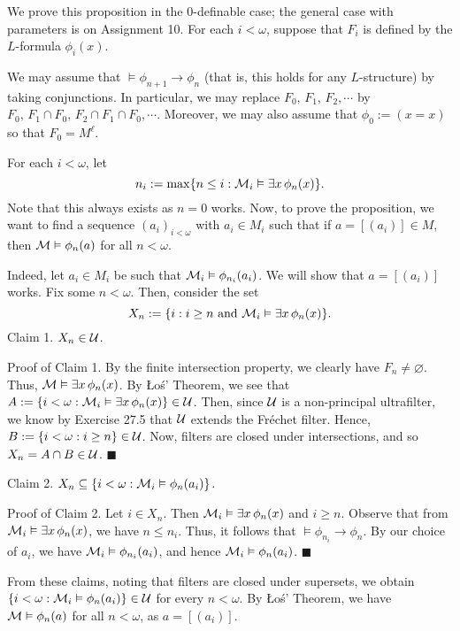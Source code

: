 \documentclass[10pt]{article}
\makeatletter
\theoremstyle{newstyle}
\newenvironment{pf}[1][\proofname]{\par
  \pushQED{\qed}%
  \normalfont \topsep0\p@\relax
  \trivlist
  \item[\hskip\labelsep\scshape
  #1\@addpunct{.}]\ignorespaces
}{%
  \popQED\endtrivlist\@endpefalse
}
\makeatother
\begin{document}
\begin{pf}
We prove this proposition in the $0$-definable case; the general case with parameters is 
on Assignment 10. For each $i < \omega$, suppose that $F_i$ is defined by the 
$L$-formula $\phi_i(x)$. 

We may assume that $\vDash \phi_{n+1} \to \phi_n$ (that is, this holds for any $L$-structure) 
by taking conjunctions. In particular, we may replace $F_0,\,F_1,\, F_2, \cdots$ 
by $F_0,\, F_1 \cap F_0,\, F_2 \cap F_1 \cap F_0, \cdots$. Moreover, 
we may also assume that $\phi_0 := (x = x)$ so that $F_0 = M^\ell$. 

For each $i < \omega$, let 
\[ n_i := \max\{n \leq i : {\cal M}_i \vDash \exists x \, \phi_n(x)\}. \]
Note that this always exists as $n = 0$ works. Now, to prove the proposition, 
we want to find a sequence $(a_i)_{i<\omega}$ with $a_i \in M_i$ such that 
if $a = [(a_i)] \in M$, then ${\cal M} \vDash \phi_n(a)$ for all $n < \omega$. 

Indeed, let $a_i \in M_i$ be such that ${\cal M}_i \vDash \phi_{n_i}(a_i)$. 
We will show that $a = [(a_i)]$ works. Fix some $n < \omega$. Then, consider the set
\[ X_n := \{i : i \geq n \text{ and } {\cal M}_i \vDash \exists x \, \phi_n(x)\}. \]
{\sc Claim 1.} $X_n \in {\cal U}$. 

{\sc Proof of Claim 1.} By the finite intersection property, we clearly have $F_n \neq \varnothing$. 
Thus, ${\cal M} \vDash \exists x \, \phi_n(x)$. By \L{}o\'s' Theorem, we see that 
$A := \{i < \omega : {\cal M}_i \vDash \exists x \, \phi_n(x)\} \in {\cal U}$. 
Then, since ${\cal U}$ is a non-principal ultrafilter, we know by Exercise 27.5 that ${\cal U}$ 
extends the Fr\'echet filter. Hence, $B := \{i < \omega : i \geq n\} \in {\cal U}$. 
Now, filters are closed under intersections, and so $X_n = A \cap B \in {\cal U}$. \hfill $\blacksquare$

{\sc Claim 2.} $X_n \subseteq \{i < \omega : {\cal M}_i \vDash \phi_n(a_i)\}$.

{\sc Proof of Claim 2.} Let $i \in X_n$. Then ${\cal M}_i \vDash \exists x \, \phi_n(x)$ and 
$i \geq n$. Observe that from ${\cal M}_i \vDash \exists x \, \phi_n(x)$, we have $n \leq n_i$.
Thus, it follows that $\vDash \phi_{n_i} \to \phi_n$. By our choice of $a_i$, we 
have ${\cal M}_i \vDash \phi_{n_i}(a_i)$, and hence ${\cal M}_i \vDash \phi_n(a_i)$. 
\hfill $\blacksquare$

From these claims, noting that filters are closed under supersets, we obtain 
$\{i < \omega : {\cal M}_i \vDash \phi_n(a_i)\} \in {\cal U}$ for every $n < \omega$. 
By \L{}o\'s' Theorem, we have ${\cal M} \vDash \phi_n(a)$ for all $n < \omega$, as 
$a = [(a_i)]$.
\end{pf}
\end{document}
